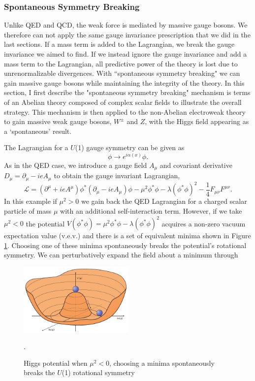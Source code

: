 \subsubsection{Spontaneous Symmetry Breaking}
Unlike QED and QCD, the weak force is mediated by massive gauge bosons. We therefore can not apply the same gauge invariance prescription that we did in the last sections. If a mass term is added to the Lagrangian, we break the gauge invariance we aimed to find. If we instead ignore the gauge invariance and add a mass term to the Lagrangian, all predictive power of the theory is lost due to unrenormalizable divergences. With ``spontaneous symmetry breaking" we can gain massive gauge bosons while maintaining the integrity of the theory. In this section, I first describe the "spontaneous symmetry breaking" mechanism is terms of an Abelian theory composed of complex scalar fields to illustrate the overall strategy. This mechanism is then applied to the non-Abelian electroweak theory to gain massive weak gauge bosons, $W^{\pm}$ and $Z$, with the Higgs field appearing as a `spontaneous' result.

The Lagrangian for a $U$(1) gauge symmetry can be given as 
\begin{equation}
\phi \rightarrow e^{i\alpha(x)}\phi.
\end{equation}
As in the QED case, we introduce a gauge field $A_\mu$ and covariant derivative $D_\mu = \partial_\mu - ieA_\mu$ to obtain the gauge invariant Lagrangian,
\begin{equation}
\mathcal{L} = (\partial^\mu+ieA^\mu)\phi^*(\partial_\mu-ieA_\mu)\phi-\mu^2\phi^*\phi-\lambda(\phi^*\phi)^2-\frac{1}{4}F_{\mu\nu}F^{\mu\nu}.
\end{equation}
In this example if $\mu^2>0$ we gain back the QED Lagrangian for a charged scalar particle of mass $\mu$ with an additional self-interaction term. However, if we take $\mu^2<0$ the potential $V(\phi^*\phi)=\mu^2\phi^*\phi-\lambda(\phi^*\phi)^2$ acquires a non-zero vacuum expectation value (v.e.v.) and there is a set of equivalent minima shown in Figure \ref{fig:HiggsPotential}. Choosing one of these minima spontaneously breaks the potential's rotational symmetry. We can perturbatively expand the field about a minimum through
\begin{figure}[H]
    \centering
    \includegraphics[width=0.5\textwidth] {Pictures/HiggsPotential.png}\hspace{1cm}
    \caption{Higgs potential when $\mu^2<0$, choosing a minima spontaneously breaks the $U$(1) rotational symmetry \cite{HiggsPotential}}.
    \label{fig:HiggsPotential}
\end{figure}

